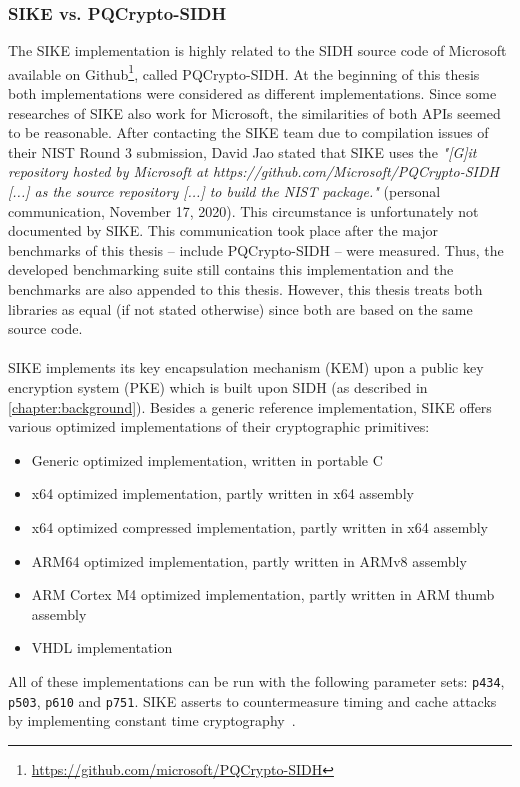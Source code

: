 \subsubsection{SIKE vs. PQCrypto-SIDH}\label{existing:sike_vs_pqcrypto}
The \gls{SIKE} implementation is highly related to the \gls{SIDH} source code of Microsoft available on Github\footnote{\url{https://github.com/microsoft/PQCrypto-SIDH}}, called \gls{PQCrypto-SIDH}. At the beginning of this thesis both implementations were considered as different implementations. Since some researches of \gls{SIKE} also work for Microsoft, the similarities of both APIs seemed to be reasonable. After contacting the \gls{SIKE} team due to compilation issues of their NIST Round 3 submission, David Jao stated that \gls{SIKE} uses the \textit{"[G]it repository hosted by Microsoft at
https://github.com/Microsoft/PQCrypto-SIDH [...] as the source
repository [...] to build the NIST package."} (personal communication, November 17, 2020). This circumstance is unfortunately not documented by \gls{SIKE}. This communication took place after the major benchmarks of this thesis -- include \gls{PQCrypto-SIDH} -- were measured. Thus, the developed benchmarking suite still contains this implementation and the benchmarks are also appended to this thesis. However, this thesis treats both libraries as equal (if not stated otherwise) since both are based on the same source code.
\\\\
\gls{SIKE} implements its key encapsulation mechanism (\gls{KEM}) upon a public key encryption system (\gls{PKE}) which is built upon \gls{SIDH} (as described in \autoref{chapter:background}). Besides a generic reference implementation, \gls{SIKE} offers various optimized implementations of their cryptographic primitives:
\begin{itemize}
  \item Generic optimized implementation, written in portable C
  \item x64 optimized implementation, partly written in x64 assembly
  \item x64 optimized compressed implementation, partly written in x64 assembly
  \item ARM64 optimized implementation, partly written in ARMv8 assembly
  \item ARM Cortex M4 optimized implementation, partly written in ARM thumb assembly
  \item VHDL implementation
\end{itemize}
All of these implementations can be run with the following parameter sets: \texttt{p434}, \texttt{p503}, \texttt{p610} and \texttt{p751}. \gls{SIKE} asserts to countermeasure timing and cache attacks by implementing constant time cryptography~\parencite{sike2020spec}.

